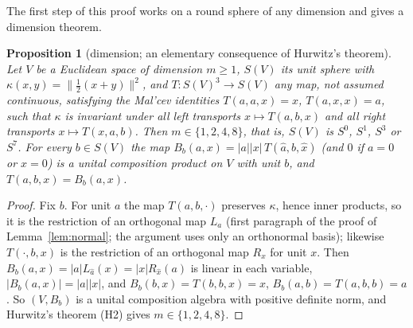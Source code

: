 \documentclass[11pt,reqno]{amsart}
\newtheorem{proposition}[theorem]{Proposition}
\theoremstyle{definition}
\theoremstyle{remark}
\numberwithin{equation}{section}
\begin{document}
The first step of this proof works on a round sphere of any dimension and gives a dimension theorem.

\begin{proposition}[dimension; an elementary consequence of Hurwitz's theorem]\label{prop:dim}
Let $V$ be a Euclidean space of dimension $m\ge1$, $S(V)$ its unit sphere with $\kappa(x,y)=\lVert\tfrac12(x+y)\rVert^2$, and
$T\colon S(V)^3\to S(V)$ any map, not assumed continuous, satisfying the Mal'cev identities $T(a,a,x)=x$, $T(a,x,x)=a$, such that $\kappa$
is invariant under all left transports $x\mapsto T(a,b,x)$ and all right transports $x\mapsto T(x,a,b)$.  Then $m\in\{1,2,4,8\}$, that is,
$S(V)$ is $S^0$, $S^1$, $S^3$ or $S^7$.  For every $b\in S(V)$ the map $B_b(a,x)=\lvert a\rvert\lvert x\rvert\,T(\hat a,b,\hat x)$ (and $0$ if $a=0$ or
$x=0$) is a unital composition product on $V$ with unit $b$, and $T(a,b,x)=B_b(a,x)$.
\end{proposition}
\begin{proof}
Fix $b$.  For unit $a$ the map $T(a,b,\cdot)$ preserves $\kappa$, hence inner products, so it is the restriction of an orthogonal map
$L_a$ (first paragraph of the proof of Lemma~\ref{lem:normal}; the argument uses only an orthonormal basis); likewise $T(\cdot,b,x)$ is the
restriction of an orthogonal map $R_x$ for unit $x$.  Then $B_b(a,x)=\lvert a\rvert L_{\hat a}(x)=\lvert x\rvert R_{\hat x}(a)$ is linear in each variable,
$\lvert B_b(a,x)\rvert=\lvert a\rvert\lvert x\rvert$, and $B_b(b,x)=T(b,b,x)=x$, $B_b(a,b)=T(a,b,b)=a$.  So $(V,B_b)$ is a unital composition algebra
with positive definite norm, and Hurwitz's theorem (H2) gives $m\in\{1,2,4,8\}$.
\end{proof}
\end{document}
